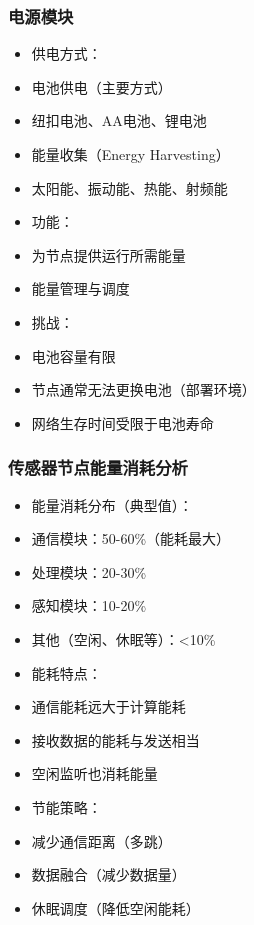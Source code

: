 \documentclass[aspectratio=43]{beamer}
\begin{document}
\begin{frame}
  \frametitle{电源模块}

  \begin{itemize}
  \item<+-> 供电方式：
  \item<+-> 电池供电（主要方式）
  \item<+-> 纽扣电池、AA电池、锂电池
  \item<+-> 能量收集（Energy Harvesting）
  \item<+-> 太阳能、振动能、热能、射频能
  \item<+-> 功能：
  \item<+-> 为节点提供运行所需能量
  \item<+-> 能量管理与调度
  \item<+-> 挑战：
  \item<+-> 电池容量有限
  \item<+-> 节点通常无法更换电池（部署环境）
  \item<+-> 网络生存时间受限于电池寿命
  \end{itemize}
\end{frame}

\begin{frame}
  \frametitle{传感器节点能量消耗分析}

  \begin{itemize}
  \item<+-> 能量消耗分布（典型值）：
  \item<+-> 通信模块：50-60\%（能耗最大）
  \item<+-> 处理模块：20-30\%
  \item<+-> 感知模块：10-20\%
  \item<+-> 其他（空闲、休眠等）：<10\%
  \item<+-> 能耗特点：
  \item<+-> 通信能耗远大于计算能耗
  \item<+-> 接收数据的能耗与发送相当
  \item<+-> 空闲监听也消耗能量
  \item<+-> 节能策略：
  \item<+-> 减少通信距离（多跳）
  \item<+-> 数据融合（减少数据量）
  \item<+-> 休眠调度（降低空闲能耗）
  \end{itemize}
\end{frame}
\end{document}
